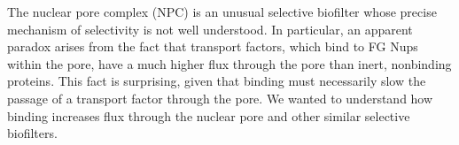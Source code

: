 %
%

The nuclear pore complex (NPC) is an unusual selective biofilter whose precise mechanism of selectivity is not well understood.  In particular, an apparent paradox arises from the fact that transport factors, which bind to FG Nups within the pore, have a much higher flux through the pore than inert, nonbinding proteins.  This fact is surprising, given that binding must necessarily slow the passage of a transport factor through the pore.  We wanted to understand how binding increases flux through the nuclear pore and other similar selective biofilters.

